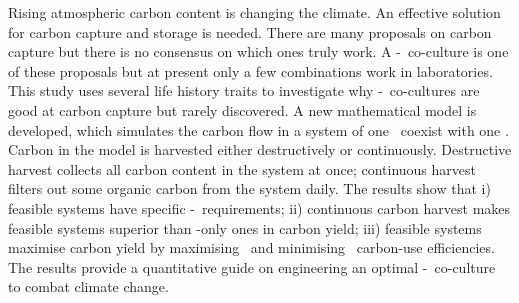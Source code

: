 \documentclass[../thesis.tex]{subfiles} %
\begin{document}
Rising atmospheric carbon content is changing the climate.  An effective solution for carbon capture and storage is needed.  There are many proposals on carbon capture but there is no consensus on which ones truly work.  A \phy-\bac\ co-culture is one of these proposals but at present only a few combinations work in laboratories.  This study uses several life history traits to investigate why \phy-\bac\ co-cultures are good at carbon capture but rarely discovered.  A new mathematical model is developed, which simulates the carbon flow in a system of one \phy\ coexist with one \bacm.  Carbon in the model is harvested either destructively or continuously.  Destructive harvest collects all carbon content in the system at once; continuous harvest filters out some organic carbon from the system daily.  The results show that \Rn{1}) feasible systems have specific \phy-\bac\ requirements; \Rn{2}) continuous carbon harvest makes feasible systems superior than \phy-only ones in carbon yield; \Rn{3}) feasible systems maximise carbon yield by maximising \phy\ and minimising \bac\ carbon-use efficiencies.  The results provide a quantitative guide on engineering an optimal \phy-\bac\ co-culture to combat climate change.
\end{document}
